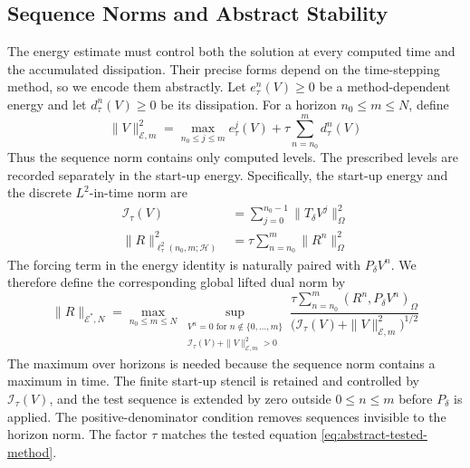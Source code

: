 \documentclass[11pt]{article}
\begin{document}
\subsection{Sequence Norms and Abstract Stability}
\label{subsec:method-adapted-norms}
The energy estimate must control both the solution at every computed time and
the accumulated dissipation. Their precise forms depend on the time-stepping
method, so we encode them abstractly.
Let \(e_{\tau}^n(V)\ge0\) be a method-dependent energy and let
\(d_{\tau}^n(V)\ge0\) be its dissipation. For a horizon
\(n_0\le m\le N\), define
\begin{equation}
\|V\|_{\mathcal E,m}^2
=\max_{n_0\le j\le m}e_{\tau}^j(V)
+\tau\sum_{n=n_0}^{m}d_{\tau}^n(V) \label{eq:method-adapted-sequence-norm}
\end{equation}
Thus the sequence norm contains only computed levels. The prescribed levels
are recorded separately in the start-up energy. Specifically, the start-up
energy and the discrete \(L^2\)-in-time norm are
\begin{align}
\mathcal I_{\tau}(V)&=\sum_{j=0}^{n_0-1}\|T_{\delta}V^j\|_{\Omega}^2 \label{eq:startup-energy}\\
\|R\|_{\ell_{\tau}^2(n_0,m;\mathcal H)}^2
&=\tau\sum_{n=n_0}^{m}\|R^n\|_{\Omega}^2 \label{eq:discrete-l2-time-norm}
\end{align}
The forcing term in the energy identity is naturally paired with
\(P_{\delta}V^n\). We therefore define the corresponding global lifted dual
norm by
\begin{equation}
\|R\|_{\mathcal E^*,N}
=\max_{n_0\le m\le N}
\sup_{\substack{V^n=0\text{ for }n\notin\{0,\ldots,m\}\\
\mathcal I_{\tau}(V)+\|V\|_{\mathcal E,m}^2>0}}
\frac{\tau\sum_{n=n_0}^{m}(R^n,P_{\delta}V^n)_{\Omega}}
{\bigl(\mathcal I_{\tau}(V)+\|V\|_{\mathcal E,m}^2\bigr)^{1/2}}
\label{eq:lifted-dual-norm}
\end{equation}
The maximum over horizons is needed because the sequence norm contains a
maximum in time. The finite start-up stencil is retained and controlled by
\(\mathcal I_{\tau}(V)\), and the test sequence is extended by zero outside
\(0\le n\le m\) before \(P_{\delta}\) is applied. The positive-denominator
condition removes sequences invisible to the horizon norm. The factor \(\tau\)
matches the tested equation \eqref{eq:abstract-tested-method}.
\end{document}
